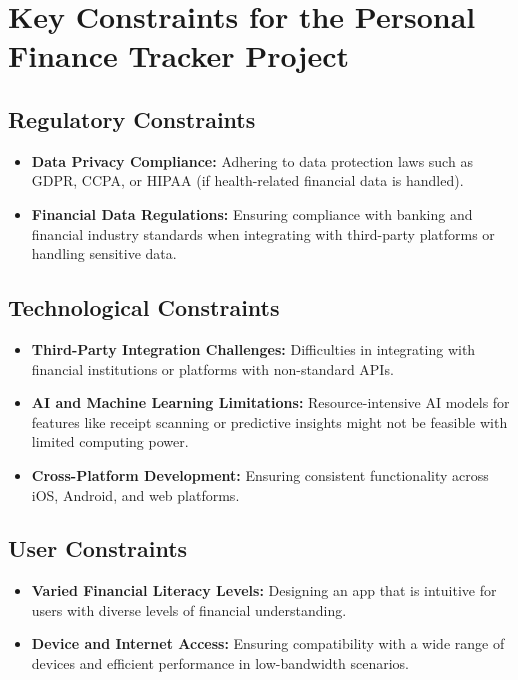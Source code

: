 
\section{Key Constraints for the Personal Finance Tracker Project}

\subsection{Regulatory Constraints}
\begin{itemize}
    \item \textbf{Data Privacy Compliance:} Adhering to data protection laws such as GDPR, CCPA, or HIPAA (if health-related financial data is handled).
    \item \textbf{Financial Data Regulations:} Ensuring compliance with banking and financial industry standards when integrating with third-party platforms or handling sensitive data.
\end{itemize}

\subsection{Technological Constraints}
\begin{itemize}
    \item \textbf{Third-Party Integration Challenges:} Difficulties in integrating with financial institutions or platforms with non-standard APIs.
    \item \textbf{AI and Machine Learning Limitations:} Resource-intensive AI models for features like receipt scanning or predictive insights might not be feasible with limited computing power.
    \item \textbf{Cross-Platform Development:} Ensuring consistent functionality across iOS, Android, and web platforms.
\end{itemize}

\subsection{User Constraints}
\begin{itemize}
    \item \textbf{Varied Financial Literacy Levels:} Designing an app that is intuitive for users with diverse levels of financial understanding.
    \item \textbf{Device and Internet Access:} Ensuring compatibility with a wide range of devices and efficient performance in low-bandwidth scenarios.
\end{itemize}

